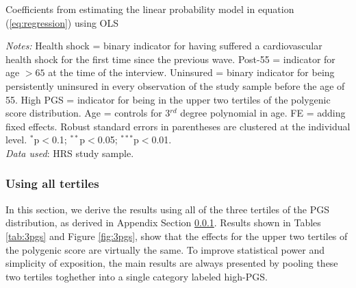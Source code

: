 \begin{table}[!ht] \centering
	\caption{Coefficients from estimating the linear probability model in equation (\ref{eq:regression}) using OLS\vspace{-0.4cm}}
	\addtolength{\tabcolsep}{-7pt}
	\label{tab:placebo_results_multi}
	\resizebox{0.55\textheight}{!}{
	
	} %
	\begin{flushleft}
	\textit{Notes:}
	Health shock = binary indicator for having suffered a cardiovascular health shock for the first time since the previous wave.
	Post-55 = indicator for age $> 65$ at the time of the interview.
	Uninsured = binary indicator for being persistently uninsured in every observation of the study sample before the age of 55.
	High PGS = indicator for being in the upper two tertiles of the polygenic score distribution.
    Age = controls for 3$^{rd}$ degree polynomial in age.
    FE = adding fixed effects.
	Robust standard errors in parentheses are clustered at the individual level.
	$^{*}$p$<$0.1; $^{**}$p$<$0.05; $^{***}$p$<$0.01.
	\\ \textit{Data used}: HRS study sample.
	\end{flushleft}
\end{table}


\subsubsection{Using all tertiles} \label{appsec:3pgs}

In this section, we derive the results using all of the three tertiles of the PGS distribution, as derived in Appendix Section \ref{appsec:3pgs}.
Results shown in Tables \ref{tab:3pgs} and Figure \ref{fig:3pgs}, show that the effects for the upper two tertiles of the polygenic score are virtually the same.
To improve statistical power and simplicity of exposition, the main results are always presented by pooling these two tertiles toghether into a single category labeled high-PGS.

